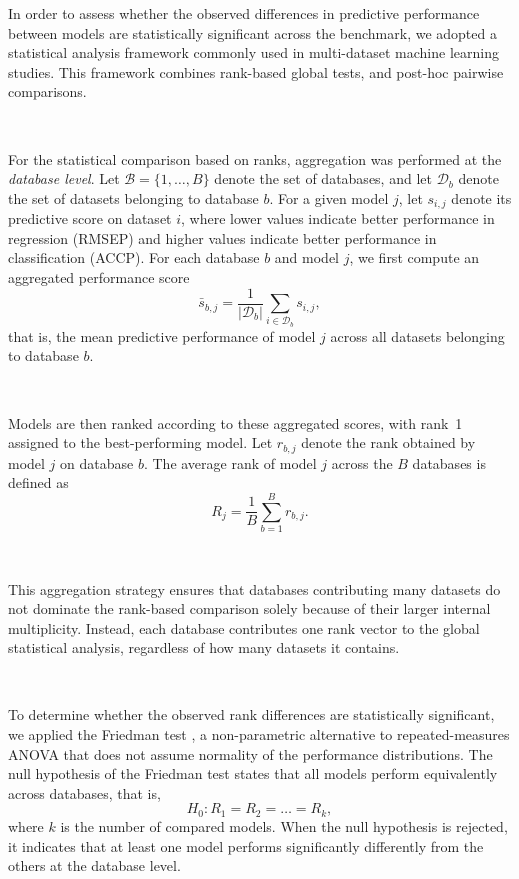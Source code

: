 \documentclass{article}
\begin{document}
In order to assess whether the observed differences in predictive performance between models are statistically significant across the benchmark, we adopted a statistical analysis framework commonly used in multi-dataset machine learning studies. This framework combines rank-based global tests, and post-hoc pairwise comparisons.

~

For the statistical comparison based on ranks, aggregation was performed at the \emph{database level}. Let $\mathcal{B}=\{1,\dots,B\}$ denote the set of databases, and let $\mathcal{D}_b$ denote the set of datasets belonging to database $b$. For a given model $j$, let $s_{i,j}$ denote its predictive score on dataset $i$, where lower values indicate better performance in regression (RMSEP) and higher values indicate better performance in classification (ACCP). For each database $b$ and model $j$, we first compute an aggregated performance score
\[
\bar{s}_{b,j} =
\frac{1}{|\mathcal{D}_b|}
\sum_{i \in \mathcal{D}_b} s_{i,j},
\]
that is, the mean predictive performance of model $j$ across all datasets belonging to database $b$.

~

Models are then ranked according to these aggregated scores, with rank~1 assigned to the best-performing model. Let $r_{b,j}$ denote the rank obtained by model $j$ on database $b$. The average rank of model $j$ across the $B$ databases is defined as
\[
R_j = \frac{1}{B}\sum_{b=1}^{B} r_{b,j}.
\]

~

This aggregation strategy ensures that databases contributing many datasets do not dominate the rank-based comparison solely because of their larger internal multiplicity. Instead, each database contributes one rank vector to the global statistical analysis, regardless of how many datasets it contains.

~

To determine whether the observed rank differences are statistically significant, we applied the Friedman test \cite{Friedman_test}, a non-parametric alternative to repeated-measures ANOVA that does not assume normality of the performance distributions. The null hypothesis of the Friedman test states that all models perform equivalently across databases, that is,
\[
H_0 : R_1 = R_2 = \dots = R_k,
\]
where $k$ is the number of compared models. When the null hypothesis is rejected, it indicates that at least one model performs significantly differently from the others at the database level.
\end{document}
